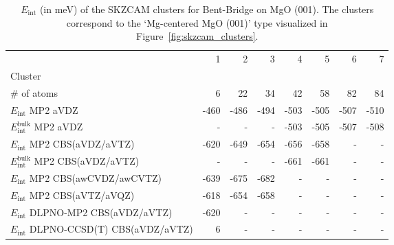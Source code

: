\begin{table}
\caption{\label{tab:system_eint_mgo_no_bent-bridge}$E_\textrm{int}$ (in meV) of the SKZCAM clusters for Bent-Bridge  on MgO (001). The clusters correspond to the `Mg-centered MgO (001)' type visualized in Figure~\ref{fig:skzcam_clusters}.}
\begin{adjustbox}{center,max width=1.4\textwidth}
\begin{tabular}{lrrrrrrr}
\toprule
 & 1 & 2 & 3 & 4 & 5 & 6 & 7 \\ 
Cluster &  &  &  &  &  &  &  \\
\midrule
\# of atoms & 6 & 22 & 34 & 42 & 58 & 82 & 84 \\
$E_\textrm{int}$ MP2 aVDZ & -460 & -486 & -494 & -503 & -505 & -507 & -510 \\
$E_\textrm{int}^\textrm{bulk}$ MP2 aVDZ & - & - & - & -503 & -505 & -507 & -508 \\
$E_\textrm{int}$ MP2 CBS(aVDZ/aVTZ) & -620 & -649 & -654 & -656 & -658 & - & - \\
$E_\textrm{int}^\textrm{bulk}$ MP2 CBS(aVDZ/aVTZ) & - & - & - & -661 & -661 & - & - \\
$E_\textrm{int}$ MP2 CBS(awCVDZ/awCVTZ) & -639 & -675 & -682 & - & - & - & - \\
$E_\textrm{int}$ MP2 CBS(aVTZ/aVQZ) & -618 & -654 & -658 & - & - & - & - \\
$E_\textrm{int}$ DLPNO-MP2 CBS(aVDZ/aVTZ) & -620 & - & - & - & - & - & - \\
$E_\textrm{int}$ DLPNO-CCSD(T) CBS(aVDZ/aVTZ) & 6 & - & - & - & - & - & - \\
\bottomrule
\end{tabular}
\end{adjustbox}
\end{table}

